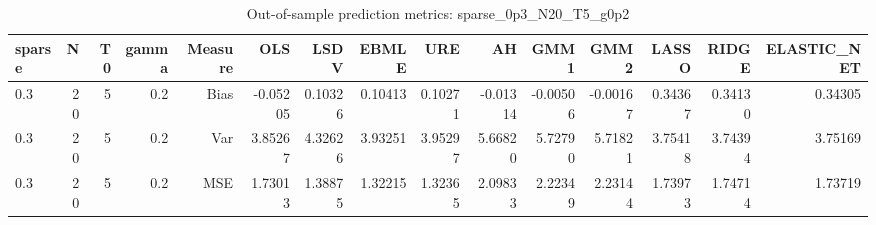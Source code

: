 \begin{table}[!htbp]\centering
\caption{Out-of-sample prediction metrics: sparse_0p3_N20_T5_g0p2}
\label{tab:table3_sparse_0p3_N20_T5_g0p2}
\begin{tabular}{lrrrrrrrrrrrrrr}
\hline
sparse & N & T0 & gamma & Measure & OLS & LSDV & EBMLE & URE & AH & GMM1 & GMM2 & LASSO & RIDGE & ELASTIC_NET \\
\hline
0.3 & 20 & 5 & 0.2 & Bias & -0.05205 & 0.10326 & 0.10413 & 0.10271 & -0.01314 & -0.00506 & -0.00167 & 0.34367 & 0.34130 & 0.34305 \\
0.3 & 20 & 5 & 0.2 & Var & 3.85267 & 4.32626 & 3.93251 & 3.95297 & 5.66820 & 5.72790 & 5.71821 & 3.75418 & 3.74394 & 3.75169 \\
0.3 & 20 & 5 & 0.2 & MSE & 1.73013 & 1.38875 & 1.32215 & 1.32365 & 2.09833 & 2.22349 & 2.23144 & 1.73973 & 1.74714 & 1.73719 \\
\hline
\end{tabular}
\end{table}

